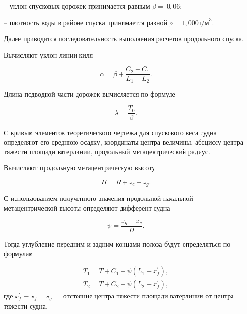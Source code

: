 -- уклон спусковых дорожек принимается равным $\beta=\ 0{,}06$;

-- плотность воды в районе спуска принимается равной $\rho=1{,}000\mathrm{т/м}^3$.

\begin{figure}[h!]
    \centerline{}
    \caption{Схема спускового устройства}
    \caption*{\textit{}}
    \label{fig:launching-device}
\end{figure}


Далее приводится последовательность выполнения расчетов продольного спуска.

Вычисляют уклон линии киля

\begin{equation}
    \alpha = \beta + \frac{C_2 - C_1}{L_1 + L_2}.
\end{equation}

Длина подводной части дорожек вычисляется по формуле

\begin{equation}
    \lambda = \frac{T_0}{\beta}.
\end{equation}

С кривым элементов теоретического чертежа для спускового веса судна определяют его среднюю осадку, координаты центра величины, абсциссу центра тяжести площади ватерлинии, продольный метацентрический радиус.

Вычисляют продольную метацентрическую высоту

\begin{equation}
    H = R + z_c - z_g.
\end{equation}

С использованием полученного значения продольной начальной метацентрической высоты определяют дифферент судна

\begin{equation}
    \psi = \frac{x_g - x_c}{H}.
\end{equation}

Тогда углубление передним и задним концами полоза будут определяться по формулам

\begin{equation}
    \begin{split}
        T_1 = T + C_1 - \psi (L_1 + x_f^\prime), \\
        T_2 = T + C_2 + \psi (L_2 - x_f^\prime),
    \end{split}
\end{equation}
где
$x_f^\prime = x_f - x_g$ --- отстояние центра тяжести площади ватерлинии от центра тяжести судна.

